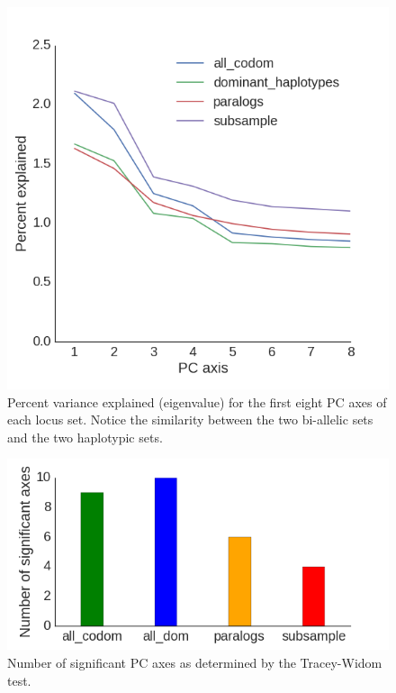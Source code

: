 \documentclass[12pt,  one column]{article}
\begin{document}
\begin{figure}[H]
\includegraphics[scale=.4]{figures/supplemental/PCA_eigenvalues.png}
\caption{Percent variance explained (eigenvalue) for the first eight PC axes of each locus set.  Notice the similarity between the two bi-allelic sets and the two haplotypic sets.}
\end{figure}

\begin{figure}[H]
\includegraphics[scale=.4]{figures/supplemental/TW_stats.png}
\caption{Number of significant PC axes as determined by the Tracey-Widom test.}
\end{figure}
\end{document}

